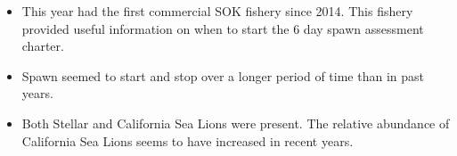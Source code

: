 \begin{itemize}

\item This year had the first commercial SOK fishery since 2014.
This fishery provided useful information on when to start the 6 day spawn assessment charter.

\item Spawn seemed to start and stop over a longer period of time than in past years.

\item Both Stellar and California Sea Lions were present.
The relative abundance of California Sea Lions seems to have increased in recent years.

\end{itemize}
